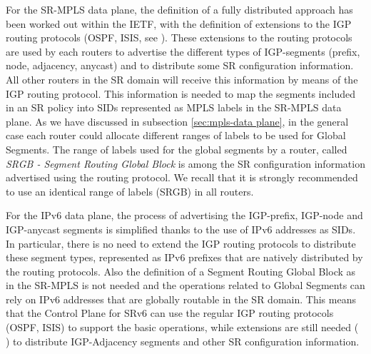 For the SR-MPLS data plane, the definition of a fully distributed approach has been worked out within the IETF, with the definition of extensions to the IGP routing protocols (OSPF, ISIS, see \cite{ietf-ospf-segment-routing-extensions} \cite{ietf-ospf-ospfv3-segment-routing-extensions} \cite{ietf-isis-segment-routing-extensions}). 
These extensions to the routing protocols are used by each routers to advertise the different types of IGP-segments (prefix, node, adjacency, anycast) and to distribute some SR configuration information. All other routers in the SR domain will receive this information by means of the IGP routing protocol. This information is needed to map the segments included in an SR policy into SIDs represented as MPLS labels in the SR-MPLS data plane. As we have discussed in subsection \ref{sec:mpls-data plane}, in the general case each router could allocate different ranges of labels to be used for Global Segments. The range of labels used for the global segments by a router, called \textit{SRGB - Segment Routing Global Block} is among the SR configuration information advertised using the routing protocol. We recall that it is strongly recommended to use an identical range of labels (SRGB) in all routers. 

For the IPv6 data plane, the process of advertising the IGP-prefix, IGP-node and IGP-anycast segments is simplified thanks to the use of IPv6 addresses as SIDs. In particular, there is no need to extend the IGP routing protocols to distribute these segment types, represented as IPv6 prefixes that are natively distributed by the routing protocols. Also the definition of a Segment Routing Global Block as in the SR-MPLS is not needed and the operations related to Global Segments can rely on IPv6 addresses that are globally routable in the SR domain. This means that the Control Plane for SRv6 can use the regular IGP routing protocols (OSPF, ISIS) to support the basic operations, while extensions are still needed (\cite{id-isis-srv6-extensions} \cite{li-ospf-ospfv3-srv6-extensions}) to distribute IGP-Adjacency segments and other SR configuration information. 

